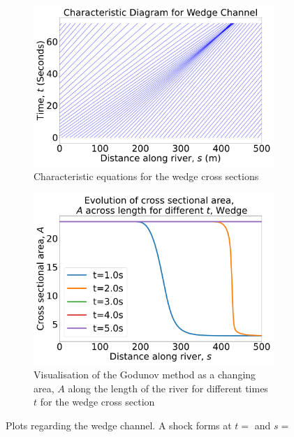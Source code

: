 \documentclass[12pt]{article}
\begin{document}
\begin{figure}[ht]
    \centering
    \begin{subfigure}[b]{0.49\textwidth}
        \centering
        \includegraphics[width=\textwidth]{Figures/Wedge_characteristic.pdf}
        \caption{Characteristic equations for the wedge cross sections}
        \label{fig:wedge_char}
    \end{subfigure}
    \hfill
    \begin{subfigure}[b]{0.49\textwidth}
        \centering
        \includegraphics[width=\textwidth]{Figures/Wedge_godunov.pdf}
        \caption{Visualisation of the Godunov method as a changing area, $A$ along the length of the river for different times $t$ for the wedge cross section}
        \label{fig:wedge_godunov}
    \end{subfigure}
    \caption{Plots regarding the wedge channel. A shock forms at $t = $ and $s = $}
\end{figure}
\end{document}
